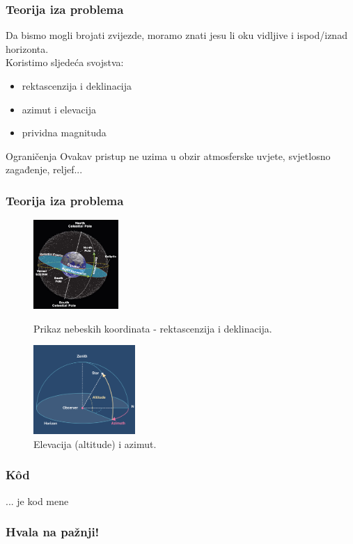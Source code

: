 \begin{frame}
	\frametitle{Teorija iza problema}
  Da bismo mogli brojati zvijezde, moramo znati jesu li oku vidljive i ispod/iznad horizonta.\\ \pause
  Koristimo sljedeća svojstva:
  \begin{itemize}
    \item rektascenzija i deklinacija
    \item azimut i elevacija
    \item prividna magnituda
  \end{itemize}
  \pause
  \medskip
  \begin{alertblock}{Ograničenja}
		Ovakav pristup ne uzima u obzir atmosferske uvjete, svjetlosno zagađenje, reljef...
	\end{alertblock}
\end{frame}

\begin{frame}
	\frametitle{Teorija iza problema}
	\begin{figure}[h]
    \begin{minipage}[t]{0.43\linewidth}
      \centering
      \includegraphics[height=128px]{assets/ext-ra_de.jpg}
      \caption{Prikaz nebeskih koordinata - rektascenzija i deklinacija.}\label{fig:ra_de}
    \end{minipage}
    \begin{minipage}[t]{0.55\linewidth}
      \centering
      \includegraphics[height=128px]{assets/ext_el-as.png}
      \caption{Elevacija (altitude) i azimut.}\label{fig:el_as}
    \end{minipage}
  \end{figure}
\end{frame}

\begin{frame}
\frametitle{Kôd}
\pause ... je kod mene
\end{frame}

\begin{frame}
\frametitle{Hvala na pažnji!}
\end{frame}

